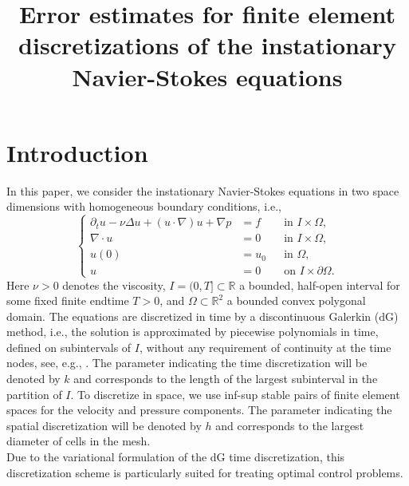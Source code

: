 \documentclass{m2an}
\newcommand{\R}{\mathbb{R}}
\begin{document}
\title{Error estimates for finite element discretizations of the
  instationary Navier-Stokes equations}


\maketitle

\section{Introduction}
In this paper, we consider the instationary Navier-Stokes equations in two space dimensions
with homogeneous boundary conditions, i.e.,
\begin{equation}\label{eq:nav_stokes_classical}
  \left\lbrace
\begin{aligned}
  \partial_t u - \nu \Delta u + (u \cdot \nabla)u + \nabla p & = f && \text{in } I \times \Omega,\\
  \nabla \cdot u & = 0 && \text{in } I \times \Omega,\\
  u(0) & = u_0 && \text{in } \Omega,\\
  u & = 0 && \text{on }I \times \partial \Omega.
\end{aligned}
\right.
\end{equation}
Here $\nu >0$ denotes the viscosity, $I = (0,T] \subset \R$ a bounded, half-open interval for some fixed
finite endtime $T>0$, and $\Omega \subset \R^2$ a bounded convex polygonal domain.
The equations are discretized in time by a
discontinuous Galerkin (dG) method, i.e., the solution is approximated
by piecewise polynomials in time, defined on subintervals of $I$, without any
requirement of continuity at the time nodes, see, e.g.,
\cite{eriksson_time_1985,thomee_galerkin_2006}.
The parameter indicating the time discretization will be denoted by $k$ and corresponds
to the length of the largest subinterval in the partition of $I$.
To discretize in space, we use
inf-sup stable pairs of finite element spaces for the velocity and pressure components.
The parameter indicating the spatial discretization will
be denoted by $h$ and corresponds to the largest diameter of cells in the mesh.
\\
Due to the variational formulation of the dG time discretization, this 
discretization scheme is particularly suited for treating optimal control problems.
\end{document}
